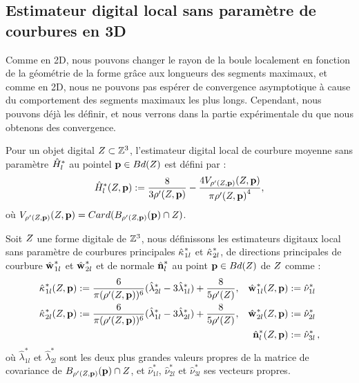 \subsection{Estimateur digital local sans paramètre de courbures en 3D}
%
Comme en 2D, nous pouvons changer le rayon de la boule localement en fonction de la géométrie de la forme grâce aux longueurs des segments maximaux, et comme en 2D, nous ne pouvons pas espérer de convergence asymptotique à cause du comportement des segments maximaux les plus longs. Cependant, nous pouvons déjà les définir, et nous verrons dans la partie expérimentale du  que nous obtenons des convergence.
%
\begin{definition}
  Pour un objet digital $Z \subset \mathbb{Z}^3$, l'estimateur digital local de
  courbure moyenne sans paramètre $\hat{H}^{*}_{l}$ au pointel $\mathbf{p} \in
  Bd({Z})$ est défini par :
  \begin{equation}
    \hat{H}^{*}_{l}( Z, \mathbf{p} ) := \frac{8}{3 {\rho'(Z, \mathbf{p})}} - \frac{4 V_{{\rho'(Z, \mathbf{p})}}(Z, \mathbf{p})}{\pi{{\rho'(\ensuremath{Z}, \ensuremath{\mathbf{p}})}}^4} ,
    \label{def:curvature-estimator-3d-mean-pfl}
  \end{equation}
  où $V_{\rho'(Z, \mathbf{p})}(Z, \mathbf{p}) = Card(B_{\rho'(Z, \mathbf{p})}(\mathbf{p}) \cap Z)$.
\end{definition}
%
\begin{definition}
  Soit $Z$ une forme digitale de $\mathbb{Z}^3$, nous définissons les estimateurs
  digitaux local sans paramètre de courbures principales $\hat{\kappa_{}}_{1l}^{*}$ et
  $\hat{\kappa_{}}_{2l}^{*}$, de directions principales de courbure $\hat{\mathbf{w}_{}}_{1l}^{*}$ et
  $\hat{\mathbf{w}_{}}_{2l}^{*}$ et de normale $\hat{\mathbf{n}{}}^{*}_{l}$ au point $\mathbf{p} \in
  Bd({Z})$ de $Z$ comme :
  \begin{align}
      \hat{\kappa_{}}_{1l}^{*}(Z, \mathbf{p})  &:= \frac{6}{\pi (\rho'(Z, \mathbf{p}))^6}(\hat{\lambda}^{*}_{2l} - 3\hat{\lambda}^{*}_{1l}) + \frac{8}{5 \rho'(Z)},
      &\hat{\mathbf{w}_{}}_{1l}^{*}(Z, \mathbf{p}) &:= \hat{\nu}^{*}_{1l} \\
      \hat{\kappa_{}}_{2l}^{*}(Z, \mathbf{p}) &:= \frac{6}{\pi (\rho'(Z, \mathbf{p}))^6}(\hat{\lambda}^{*}_{1l} - 3\hat{\lambda}^{*}_{2l}) + \frac{8}{5 \rho'(Z)},
      &\hat{\mathbf{w}_{}}_{2l}^{*}(Z, \mathbf{p}) &:= \hat{\nu}^{*}_{2l}\\
      & &\hat{\mathbf{n}{}}^{*}_{l}(Z, \mathbf{p}) &:=\hat{\nu}^{*}_{3l}\,,
  \end{align}
  où $\hat{\lambda}^{*}_{1l}$ et $\hat{\lambda}^{*}_{2l}$ sont les deux plus grandes
  valeurs propres de la matrice de covariance de $B_{{\rho'(Z, \mathbf{p})}}(\mathbf{p})
  \cap Z$, et $ \hat{\nu}^{*}_{1l}$, $\hat{\nu}^{*}_{2l}$ et $\hat{\nu}^{*}_{3l}$
  ses vecteurs propres.
  \label{def:curvature-estimator-3d-k1k2-pfl}
\end{definition}
%
